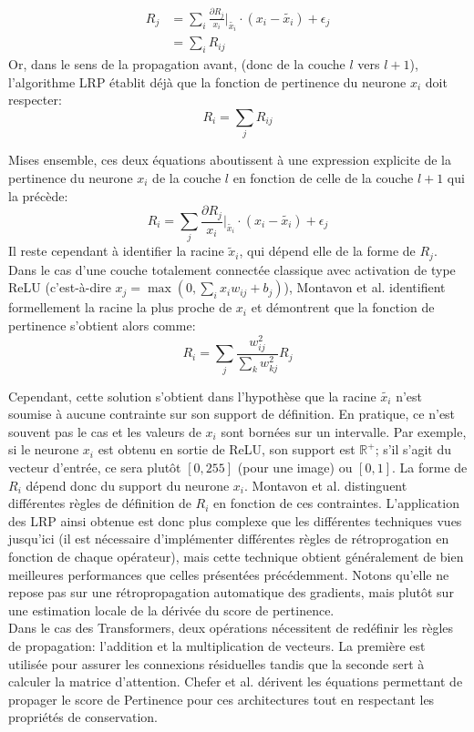 \begin{align*}
	R_j &= \sum_{i} \frac{\partial R_j}{x_i}|_{\tilde{x_i}} \cdot (x_i - \tilde{x_i}) + \epsilon_j
	\\
	&=\sum_{i}R_{ij}
\end{align*}
Or, dans le sens de la propagation avant, (donc de la couche $l$ vers $l+1$), l'algorithme LRP établit déjà que la fonction de pertinence du neurone $x_i$ doit respecter:
\begin{equation}
	R_i = \sum_j R_{ij}
\end{equation}

Mises ensemble, ces deux équations aboutissent à une expression explicite de la pertinence du neurone $x_i$ de la couche $l$ en fonction de celle de la couche $l+1$ qui la précède:
\begin{equation}
	R_i = \sum_j \frac{\partial R_j}{x_i}|_{\tilde{x_i}} \cdot (x_i - \tilde{x_i}) + \epsilon_j
\end{equation}
Il reste cependant à identifier la racine $\tilde{x}_i$, qui dépend elle de la forme de $R_j$. Dans le cas d'une couche totalement connectée classique avec activation de type ReLU (c'est-à-dire $x_j = \max(0, \sum_i x_iw_{ij}+b_j)$), Montavon et al. identifient formellement la racine la plus proche de $x_i$ et démontrent que la fonction de pertinence s'obtient alors comme:
\begin{equation}
	R_i = \sum_j \frac{w_{ij}^2}{\sum_{k} w_{kj}^2}R_j
\end{equation}

Cependant, cette solution s'obtient dans l'hypothèse que la racine $\tilde{x_i}$ n'est soumise à aucune contrainte sur son support de définition. En pratique, ce n'est souvent pas le cas et les valeurs de $x_i$ sont bornées sur un intervalle. Par exemple, si le neurone $x_i$ est obtenu en sortie de ReLU, son support est $\mathbb{R}^+$; s'il s'agit du vecteur d'entrée, ce sera plutôt $\left[0, 255 \right] $ (pour une image) ou $\left[0, 1\right] $. La forme de $R_i$ dépend donc du support du neurone $x_i$. Montavon et al. distinguent différentes règles de définition de $R_i$ en fonction de ces contraintes. L'application des LRP ainsi obtenue est donc plus complexe que les différentes techniques vues jusqu'ici (il est nécessaire d'implémenter différentes règles de rétroprogation en fonction de chaque opérateur), mais cette technique obtient généralement de bien meilleures performances que celles présentées précédemment. Notons qu'elle ne repose pas sur une rétropropagation automatique des gradients, mais plutôt sur une estimation locale de la dérivée du score de pertinence.
\\ 
Dans le cas des Transformers, deux opérations nécessitent de redéfinir les règles de propagation: l'addition et la multiplication de vecteurs. La première est utilisée pour assurer les connexions résiduelles tandis que la seconde sert à calculer la matrice d'attention. Chefer et al. \cite{cheferTransformerInterpretabilityAttention2021} dérivent les équations permettant de propager le score de Pertinence pour ces architectures tout en respectant les propriétés de conservation.


